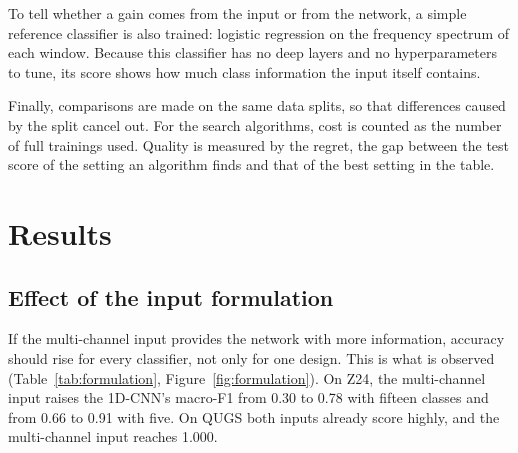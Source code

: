\documentclass[11pt,a4paper]{article}
\begin{document}
To tell whether a gain comes from the input or from the network, a simple reference classifier is also trained: logistic regression on the frequency spectrum of each window. Because this classifier has no deep layers and no hyperparameters to tune, its score shows how much class information the input itself contains.

Finally, comparisons are made on the same data splits, so that differences caused by the split cancel out. For the search algorithms, cost is counted as the number of full trainings used. Quality is measured by the regret, the gap between the test score of the setting an algorithm finds and that of the best setting in the table.

\section{Results}\label{sec:results}

\subsection{Effect of the input formulation}\label{sec:formulation}

If the multi-channel input provides the network with more information, accuracy should rise for every classifier, not only for one design. This is what is observed (Table~\ref{tab:formulation}, Figure~\ref{fig:formulation}). On Z24, the multi-channel input raises the 1D-CNN's macro-F1 from 0.30 to 0.78 with fifteen classes and from 0.66 to 0.91 with five. On QUGS both inputs already score highly, and the multi-channel input reaches 1.000.
\end{document}
